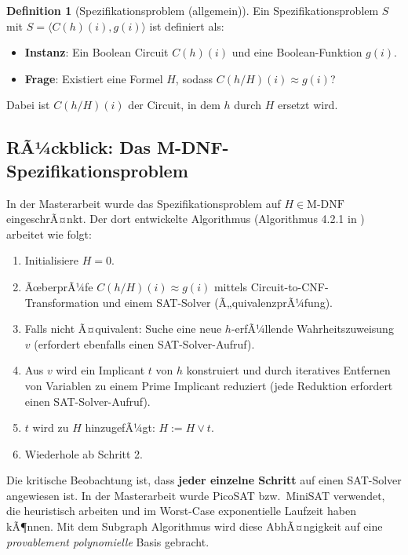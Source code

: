 ﻿\documentclass[a4paper,12pt]{article}
\theoremstyle{definition}
\newtheorem{definition}{Definition}
\begin{document}
\begin{definition}[Spezifikationsproblem (allgemein)]
    Ein Spezifikationsproblem $S$ mit $S = \langle C(h)(i), g(i) \rangle$ ist definiert als:
    \begin{itemize}
        \item \textbf{Instanz}: Ein Boolean Circuit $C(h)(i)$ und eine Boolean-Funktion $g(i)$.
        \item \textbf{Frage}: Existiert eine Formel $H$, sodass $C(h/H)(i) \approx g(i)$?
    \end{itemize}
    Dabei ist $C(h/H)(i)$ der Circuit, in dem $h$ durch $H$ ersetzt wird.
\end{definition}

\subsection{RÃ¼ckblick: Das M-DNF-Spezifikationsproblem}

In der Masterarbeit \cite{Epp13} wurde das Spezifikationsproblem auf $H \in \text{M-DNF}$ eingeschrÃ¤nkt. Der dort entwickelte Algorithmus (Algorithmus 4.2.1 in \cite{Epp13}) arbeitet wie folgt:

\begin{enumerate}
    \item Initialisiere $H = 0$.
    \item ÃœberprÃ¼fe $C(h/H)(i) \approx g(i)$ mittels Circuit-to-CNF-Transformation und einem SAT-Solver (Ã„quivalenzprÃ¼fung).
    \item Falls nicht Ã¤quivalent: Suche eine neue $h$-erfÃ¼llende Wahrheitszuweisung $v$ (erfordert ebenfalls einen SAT-Solver-Aufruf).
    \item Aus $v$ wird ein Implicant $t$ von $h$ konstruiert und durch iteratives Entfernen von Variablen zu einem Prime Implicant reduziert (jede Reduktion erfordert einen SAT-Solver-Aufruf).
    \item $t$ wird zu $H$ hinzugefÃ¼gt: $H := H \lor t$.
    \item Wiederhole ab Schritt 2.
\end{enumerate}

Die kritische Beobachtung ist, dass \textbf{jeder einzelne Schritt} auf einen SAT-Solver angewiesen ist. In der Masterarbeit wurde PicoSAT \cite{Bie08} bzw.\ MiniSAT \cite{ES04} verwendet, die heuristisch arbeiten und im Worst-Case exponentielle Laufzeit haben kÃ¶nnen. Mit dem Subgraph Algorithmus wird diese AbhÃ¤ngigkeit auf eine \textit{provablement polynomielle} Basis gebracht.
\end{document}
